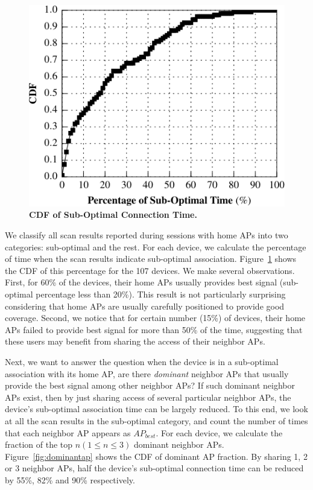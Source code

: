\begin{figure}[t]
  \centering
  \includegraphics[width=\columnwidth]{./figures/HomeAPSessionRSSI.pdf}
  \caption{\textbf{CDF of Sub-Optimal Connection Time.}}
  \label{fig:suboptimal}
\end{figure}

We classify all scan results reported during \wifi{} sessions with home APs into
two categories: sub-optimal and the rest. For each device, we calculate the
percentage of time when the scan results indicate sub-optimal association.
Figure~\ref{fig:suboptimal} shows the CDF of this percentage for 
the 107 devices. We make several observations. First, for 60\% of the devices,
their home APs usually provides best signal (sub-optimal percentage less than
20\%). This result is not particularly surprising considering that home APs are
usually carefully positioned to provide good coverage. Second, we notice
that for certain number (15\%) of devices, their home APs failed to provide best
signal for more than 50\% of the time, suggesting that these users may benefit
from sharing the \wifi{} access of their neighbor APs.

Next, we want to answer the question when the device is in a sub-optimal association
with its home AP, are there \textit{dominant} neighbor APs that
usually provide the best signal among other neighbor APs? If such dominant
neighbor APs exist, then by just sharing access of several particular neighbor
APs, the device's sub-optimal association time can be largely reduced. To this
end, we look at all the scan results in the sub-optimal category, and count the
number of times that each neighbor AP appears as $AP_{best}$. For each device,
we calculate the fraction of the top $n (1 \le n \le 3)$ dominant neighbor APs.
Figure~\ref{fig:dominantap} shows the CDF of dominant AP fraction. By sharing 1,
2 or 3 neighbor APs, half the device's sub-optimal connection time can be
reduced by 55\%, 82\% and 90\% respectively.

